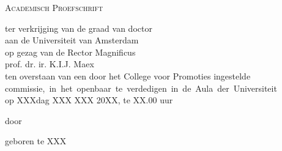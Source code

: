 {%

\clearpage
\par\vskip 2cm
\printtitle
\begin{center}
\par\vspace {6cm}
{\large \textsc{Academisch Proefschrift}}
\par\vspace {1cm}
{\large ter verkrijging van de graad van doctor\\
aan de Universiteit van Amsterdam\\
op gezag van de Rector Magnificus\\
prof. dr. ir. K.I.J. Maex\\ %
ten overstaan van een door het College voor Promoties ingestelde\\
\mbox{commissie, in het openbaar te verdedigen in de Aula der Universiteit}\\ %
op XXXdag XXX XXX 20XX, te XX.00 uur\\ } %
\par\vspace {1cm} {\large door}
\par \vspace {1cm} %
{\Large \mylongauthor}
\par\vspace {1cm} %
{\large geboren te XXX}%
\end{center}

}
